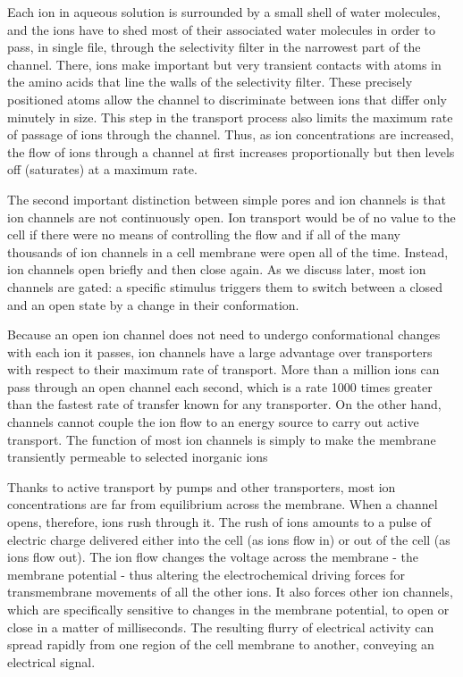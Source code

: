 Each ion in aqueous solution is surrounded by a small shell of water molecules,
and the ions have to shed most of their associated water molecules in
order to pass, in single file, through the selectivity filter in the narrowest
part of the channel. There, ions make important but very transient contacts
with atoms in the amino acids that line the walls of the selectivity
filter. These precisely positioned atoms allow the channel
to discriminate between ions that differ only minutely in size. This
step in the transport process also limits the maximum rate of passage of
ions through the channel. Thus, as ion concentrations are increased, the
flow of ions through a channel at first increases proportionally but then
levels off (saturates) at a maximum rate.

The second important distinction between simple pores and ion channels
is that ion channels are not continuously open. Ion transport would be of
no value to the cell if there were no means of controlling the flow and if
all of the many thousands of ion channels in a cell membrane were open
all of the time. Instead, ion channels open briefly and then close again.
As we discuss later, most ion channels are gated: a specific
stimulus triggers them to switch between a closed and an open state
by a change in their conformation.

Because an open ion channel does not need to undergo conformational
changes with each ion it passes, ion channels have a large advantage
over transporters with respect to their maximum rate of transport. More
than a million ions can pass through an open channel each second, which
is a rate 1000 times greater than the fastest rate of transfer known for
any transporter. On the other hand, channels cannot couple the ion flow
to an energy source to carry out active transport. The function of most
ion channels is simply to make the membrane transiently permeable to
selected inorganic ions

Thanks to active transport by pumps and other transporters, most ion
concentrations are far from equilibrium across the membrane. When a
channel opens, therefore, ions rush through it. The rush of ions amounts
to a pulse of electric charge delivered either into the cell (as ions flow
in) or out of the cell (as ions flow out). The ion flow changes the voltage
across the membrane - the membrane potential - thus altering the
electrochemical driving forces for transmembrane movements of all the
other ions. It also forces other ion channels, which are specifically sensitive
to changes in the membrane potential, to open or close in a matter of
milliseconds. The resulting flurry of electrical activity can spread rapidly
from one region of the cell membrane to another, conveying an electrical
signal.

